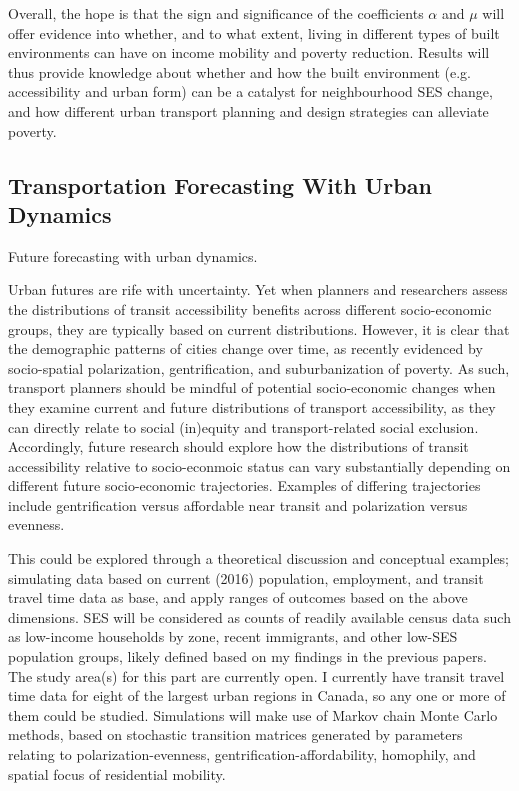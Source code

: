 Overall, the hope is that the sign and significance of the coefficients $\alpha$ and $\mu$ will offer evidence into whether, and to what extent, living in different types of built environments can have on income mobility and poverty reduction. Results will thus provide knowledge about whether and how the built environment (e.g. accessibility and urban form) can be a catalyst for neighbourhood SES change, and how different urban transport planning and design strategies can alleviate poverty.




\subsection{Transportation Forecasting With Urban Dynamics}

Future forecasting with urban dynamics.

Urban futures are rife with uncertainty. Yet when planners and researchers assess the distributions of transit accessibility benefits across different socio-economic groups, they are typically based on current distributions. However, it is clear that the demographic patterns of cities change over time, as recently evidenced by socio-spatial polarization, gentrification, and suburbanization of poverty. As such, transport planners should be mindful of potential socio-economic changes when they examine current and future distributions of transport accessibility, as they can directly relate to social (in)equity and transport-related social exclusion. Accordingly, future research should explore how the distributions of transit accessibility relative to socio-econmoic status can vary substantially depending on different future socio-economic trajectories. Examples of differing trajectories include gentrification versus affordable near transit and polarization versus evenness. 

This could be explored through a theoretical discussion and conceptual examples; simulating data based on current (2016) population, employment, and transit travel time data as base, and apply ranges of outcomes based on the above dimensions. 
SES will be considered as counts of readily available census data such as low-income households by zone, recent immigrants, and other low-SES population groups, likely defined based on my findings in the previous papers. The study area(s) for this part are currently open. I currently have transit travel time data for eight of the largest urban regions in Canada, so any one or more of them could be studied. Simulations will make use of Markov chain Monte Carlo methods, based on stochastic transition matrices generated by parameters relating to polarization-evenness, gentrification-affordability, homophily, and spatial focus of residential mobility. 


